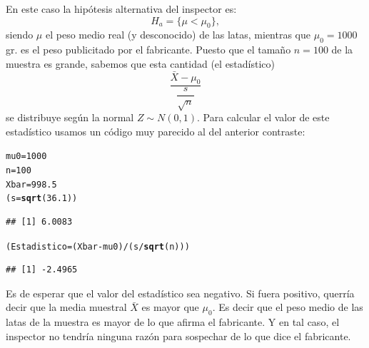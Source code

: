 \documentclass[10pt,a4paper]{article}\usepackage[]{graphicx}\usepackage[]{color}
\makeatletter
\newcommand{\hlnum}[1]{\textcolor[rgb]{0.686,0.059,0.569}{#1}}%
\newcommand{\hlopt}[1]{\textcolor[rgb]{0,0,0}{#1}}%
\newcommand{\hlstd}[1]{\textcolor[rgb]{0.345,0.345,0.345}{#1}}%
\newcommand{\hlkwb}[1]{\textcolor[rgb]{0.69,0.353,0.396}{#1}}%
\newcommand{\hlkwd}[1]{\textcolor[rgb]{0.737,0.353,0.396}{\textbf{#1}}}%
\newenvironment{kframe}{%
 \def\at@end@of@kframe{}%
 \ifinner\ifhmode%
  \def\at@end@of@kframe{\end{minipage}}%
  \begin{minipage}{\columnwidth}%
 \fi\fi%
 \def\FrameCommand##1{\hskip\@totalleftmargin \hskip-\fboxsep
 \colorbox{shadecolor}{##1}\hskip-\fboxsep
     \hskip-\linewidth \hskip-\@totalleftmargin \hskip\columnwidth}%
 \MakeFramed {\advance\hsize-\width
   \@totalleftmargin\z@ \linewidth\hsize
   \@setminipage}}%
 {\par\unskip\endMakeFramed%
 \at@end@of@kframe}
\newenvironment{knitrout}{}{} %
\newcounter {cont01}
\makeatother
\begin{document}
En este caso la hipótesis alternativa del inspector es:
\[H_a=\{\mu < \mu_0\},\]
siendo $\mu$ el peso medio real (y desconocido) de las latas, mientras que $\mu_0 = 1000$ gr. es el peso publicitado por el fabricante. Puesto que el tamaño $n = 100$ de la muestra es grande, sabemos que esta cantidad (el estadístico)
\[\dfrac{\bar X - \mu_0}{\dfrac{s}{\sqrt{n}}}\]
se distribuye según la normal $Z\sim N(0,1)$. Para calcular el valor de este estadístico usamos un código muy parecido al del anterior contraste:
\begin{knitrout}
\color{fgcolor}\begin{kframe}
\begin{alltt}
\hlstd{mu0} \hlkwb{=} \hlnum{1000}
\hlstd{n} \hlkwb{=} \hlnum{100}
\hlstd{Xbar} \hlkwb{=} \hlnum{998.5}
\hlstd{(s} \hlkwb{=} \hlkwd{sqrt}\hlstd{(}\hlnum{36.1}\hlstd{))}
\end{alltt}
\begin{verbatim}
## [1] 6.0083
\end{verbatim}
\begin{alltt}
\hlstd{(Estadistico} \hlkwb{=} \hlstd{(Xbar} \hlopt{-} \hlstd{mu0)} \hlopt{/} \hlstd{(s} \hlopt{/} \hlkwd{sqrt}\hlstd{(n)))}
\end{alltt}
\begin{verbatim}
## [1] -2.4965
\end{verbatim}
\end{kframe}
\end{knitrout}
Es de esperar que el valor del estadístico sea negativo. Si fuera positivo, querría decir que la media muestral $\bar X$ es mayor que $\mu_0$. Es decir que el peso medio de las latas de la muestra es mayor de lo que afirma el fabricante. Y en tal caso, el inspector no tendría ninguna razón para sospechar de lo que dice el fabricante.
\end{document}
